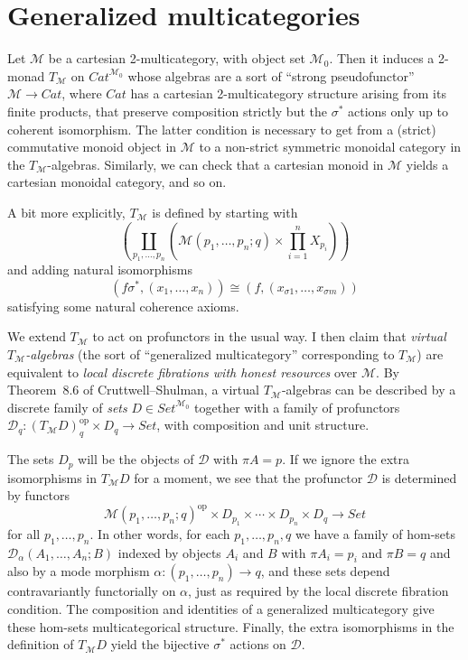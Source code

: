 \documentclass{amsart}
\theoremstyle{definition}
\def\M{\mathcal{M}}
\def\D{\mathcal{D}}
\begin{document}
\section{Generalized multicategories}
\label{sec:genmulti}

Let $\M$ be a cartesian 2-multicategory, with object set $\M_0$.
Then it induces a 2-monad $T_\M$ on $\mathit{Cat}^{\M_0}$ whose algebras are a sort of ``strong pseudofunctor'' $\M\to \mathit{Cat}$, where $\mathit{Cat}$ has a cartesian 2-multicategory structure arising from its finite products, that preserve composition strictly but the $\sigma^*$ actions only up to coherent isomorphism.
The latter condition is necessary to get from a (strict) commutative monoid object in $\M$ to a non-strict symmetric monoidal category in the $T_\M$-algebras.
Similarly, we can check that a cartesian monoid in $\M$ yields a cartesian monoidal category, and so on.

A bit more explicitly, $T_\M$ is defined by starting with
\begin{equation*}
  \left(\coprod_{p_1,\dots,p_n} \left(\M(p_1,\dots,p_n;q) \times \prod_{i=1}^n X_{p_i} \right)\right)
\end{equation*}
and adding natural isomorphisms
\[ (f\sigma^*,(x_1,\dots,x_n))\cong (f,(x_{\sigma 1},\dots,x_{\sigma m})) \]
satisfying some natural coherence axioms.

We extend $T_\M$ to act on profunctors in the usual way.
I then claim that \emph{virtual $T_\M$-algebras} (the sort of ``generalized multicategory'' corresponding to $T_\M$) are equivalent to \emph{local discrete fibrations with honest resources} over $\M$.
By Theorem~8.6 of Cruttwell--Shulman, a virtual $T_\M$-algebras can be described by a discrete family of \emph{sets} $D\in \mathit{Set}^{\M_0}$ together with a family of profunctors $\D_q:(T_\M D)_q^{\mathrm{op}} \times D_q \to \mathit{Set}$, with composition and unit structure.

The sets $D_p$ will be the objects of $\D$ with $\pi A = p$.
If we ignore the extra isomorphisms in $T_\M D$ for a moment, we see that the profunctor $\D$ is determined by functors
\[ \M(p_1,\dots,p_n;q)^{\mathrm{op}} \times D_{p_1}\times\cdots\times D_{p_n} \times D_q \to \mathit{Set} \]
for all $p_1,\dots, p_n$.
In other words, for each $p_1,\dots, p_n,q$ we have a family of hom-sets $\D_\alpha(A_1,\dots,A_n;B)$ indexed by objects $A_i$ and $B$ with $\pi A_i = p_i$ and $\pi B = q$ and also by a mode morphism $\alpha:(p_1,\dots,p_n)\to q$, and these sets depend contravariantly functorially on $\alpha$, just as required by the local discrete fibration condition.
The composition and identities of a generalized multicategory give these hom-sets multicategorical structure.
Finally, the extra isomorphisms in the definition of $T_\M D$ yield the bijective $\sigma^*$ actions on $\D$.
\end{document}
